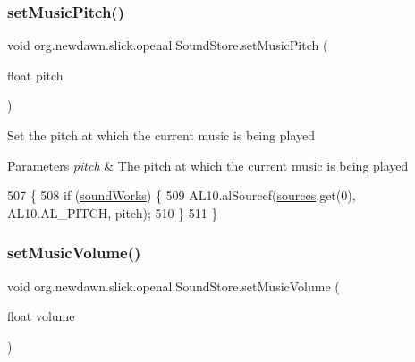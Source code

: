 \subsubsection{\texorpdfstring{set\+Music\+Pitch()}{setMusicPitch()}}
{\footnotesize\ttfamily void org.\+newdawn.\+slick.\+openal.\+Sound\+Store.\+set\+Music\+Pitch (\begin{DoxyParamCaption}\item[{float}]{pitch }\end{DoxyParamCaption})\hspace{0.3cm}{\ttfamily [inline]}}

Set the pitch at which the current music is being played


\begin{DoxyParams}{Parameters}
{\em pitch} & The pitch at which the current music is being played \\
\hline
\end{DoxyParams}

\begin{DoxyCode}
507                                            \{
508         \textcolor{keywordflow}{if} (\mbox{\hyperlink{classorg_1_1newdawn_1_1slick_1_1openal_1_1_sound_store_ae563e9c1a01e333dc2350f1450f451fd}{soundWorks}}) \{
509             AL10.alSourcef(\mbox{\hyperlink{classorg_1_1newdawn_1_1slick_1_1openal_1_1_sound_store_a3a2ffa73acd847102bb30140129c440b}{sources}}.get(0), AL10.AL\_PITCH, pitch);
510         \}
511     \}
\end{DoxyCode}
\mbox{\label{classorg_1_1newdawn_1_1slick_1_1openal_1_1_sound_store_a004456c4757e412245ae6f1dbb0319d1}} 
\subsubsection{\texorpdfstring{set\+Music\+Volume()}{setMusicVolume()}}
{\footnotesize\ttfamily void org.\+newdawn.\+slick.\+openal.\+Sound\+Store.\+set\+Music\+Volume (\begin{DoxyParamCaption}\item[{float}]{volume }\end{DoxyParamCaption})\hspace{0.3cm}{\ttfamily [inline]}}

